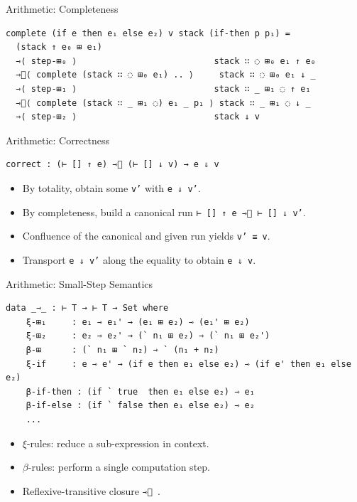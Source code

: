 \documentclass[10pt,compress,aspectratio=169]{beamer}
\begin{document}
\begin{frame}[fragile]{Arithmetic: Completeness}
\begin{verbatim}
complete (if e then e₁ else e₂) v stack (if-then p p₁) =
  (stack ↑ e₀ ⊞ e₁)
  ⇾⟨ step-⊞₀ ⟩                           stack ∷ ◌ ⊞₀ e₁ ↑ e₀
  ⇾⃰⟨ complete (stack ∷ ◌ ⊞₀ e₁) .. ⟩     stack ∷ ◌ ⊞₀ e₁ ↓ _
  ⇾⟨ step-⊞₁ ⟩                           stack ∷ _ ⊞₁ ◌ ↑ e₁
  ⇾⃰⟨ complete (stack ∷ _ ⊞₁ ◌) e₁ _ p₁ ⟩ stack ∷ _ ⊞₁ ◌ ↓ _
  ⇾⟨ step-⊞₂ ⟩                           stack ↓ v
\end{verbatim}
\end{frame}

\begin{frame}[fragile]{Arithmetic: Correctness}
\begin{verbatim}
correct : (⊢ [] ↑ e) ⇾⃰ (⊢ [] ↓ v) → e ⇓ v
\end{verbatim}
\begin{itemize}
    \item By totality, obtain some \texttt{v'} with \texttt{e ⇓ v'}.
    \item By completeness, build a canonical run \texttt{⊢ [] ↑ e ⇾⃰ ⊢ [] ↓ v'}.
    \item Confluence of the canonical and given run yields \texttt{v' ≡ v}.
    \item Transport \texttt{e ⇓ v'} along the equality to obtain \texttt{e ⇓ v}.
\end{itemize}
\end{frame}

\begin{frame}[fragile]{Arithmetic: Small-Step Semantics}
\begin{verbatim}
data _⇾_ : ⊢ T → ⊢ T → Set where
    ξ-⊞₁     : e₁ ⇾ e₁' → (e₁ ⊞ e₂) ⇾ (e₁' ⊞ e₂)
    ξ-⊞₂     : e₂ ⇾ e₂' → (` n₁ ⊞ e₂) ⇾ (` n₁ ⊞ e₂')
    β-⊞      : (` n₁ ⊞ ` n₂) ⇾ ` (n₁ + n₂)
    ξ-if     : e ⇾ e' → (if e then e₁ else e₂) ⇾ (if e' then e₁ else e₂)
    β-if-then : (if ` true  then e₁ else e₂) ⇾ e₁
    β-if-else : (if ` false then e₁ else e₂) ⇾ e₂
    ...
\end{verbatim}
\begin{itemize}
    \item $\xi$-rules: reduce a sub-expression in context.
    \item $\beta$-rules: perform a single computation step.
    \item Reflexive-transitive closure \texttt{⇾⃰ }.
\end{itemize}
\end{frame}
\end{document}
